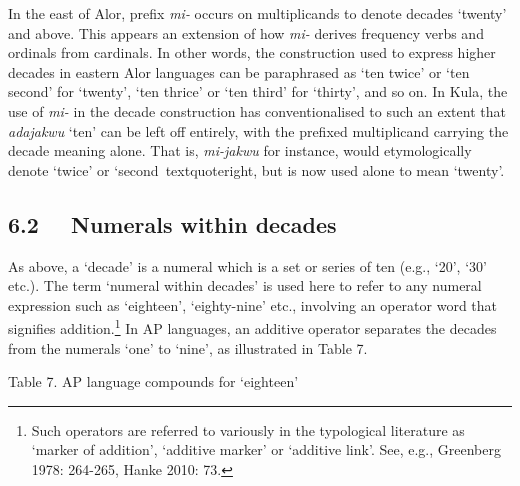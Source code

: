In the east of Alor, prefix \textit{mi- }occurs on multiplicands to denote decades {\textquoteleft}twenty{\textquoteright} and above. This appears an extension of how \textit{mi-}\textsc{ }derives frequency verbs and ordinals from cardinals. In other words, the construction used to express higher decades in eastern Alor languages can be paraphrased as {\textquoteleft}ten twice{\textquoteright} or {\textquoteleft}ten second{\textquoteright} for {\textquoteleft}twenty{\textquoteright}, {\textquoteleft}ten thrice{\textquoteright} or {\textquoteleft}ten third{\textquoteright} for {\textquoteleft}thirty{\textquoteright}, and so on. In Kula, the use of \textit{mi- }in the decade construction has conventionalised to such an extent that \textit{adajakwu} {\textquoteleft}ten{\textquoteright} can be left off entirely, with the prefixed multiplicand carrying the decade meaning alone. That is, \textit{mi-jakwu} for instance, would etymologically denote {\textquoteleft}twice{\textquoteright} or {\textquoteleft}second{\
textquoteright}, but is now used alone to mean {\textquoteleft}twenty{\textquoteright}.

\subsection[6.2 \ \ Numerals within decades ]{6.2 \ \ Numerals within decades }
As above, a {\textquoteleft}decade{\textquoteright} is a numeral which is a set or series of ten (e.g., {\textquoteleft}20{\textquoteright}, {\textquoteleft}30{\textquoteright} etc.). The term {\textquoteleft}numeral within decades{\textquoteright} is used here to refer to any numeral expression such as {\textquoteleft}eighteen{\textquoteright}, {\textquoteleft}eighty-nine{\textquoteright} etc., involving an operator word that signifies addition.\footnote{Such operators are referred to variously in the typological literature as {\textquoteleft}marker of addition{\textquoteright}, {\textquoteleft}additive marker{\textquoteright} or {\textquoteleft}additive link{\textquoteright}. See, e.g., Greenberg 1978: 264-265, Hanke 2010: 73.} In AP languages, an additive operator separates the decades from the numerals {\textquoteleft}one{\textquoteright} to {\textquoteleft}nine{\textquoteright}, as illustrated in Table 7.

{\centering
Table 7. AP language compounds for {\textquoteleft}eighteen{\textquoteright}
\par}

